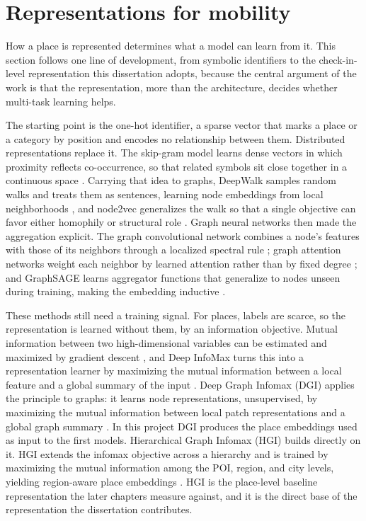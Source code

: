 
\section{Representations for mobility}
\label{sec:fund:repr}

How a place is represented determines what a model can learn from it. This section
follows one line of development, from symbolic identifiers to the check-in-level
representation this dissertation adopts, because the central argument of the work is
that the representation, more than the architecture, decides whether multi-task
learning helps.

The starting point is the one-hot identifier, a sparse vector that marks a place or a
category by position and encodes no relationship between them. Distributed
representations replace it. The skip-gram model learns dense vectors in which
proximity reflects co-occurrence, so that related symbols sit close together in a
continuous space \cite{mikolov2013word2vec}. Carrying that idea to graphs, DeepWalk
samples random walks and treats them as sentences, learning node embeddings from
local neighborhoods \cite{perozzi2014deepwalk}, and node2vec generalizes the walk so
that a single objective can favor either homophily or structural role
\cite{grover2016node2vec}. Graph neural networks then made the aggregation explicit.
The graph convolutional network combines a node's features with those of its
neighbors through a localized spectral rule \cite{kipf2017gcn}; graph attention
networks weight each neighbor by learned attention rather than by fixed degree
\cite{velivckovic2017graph}; and GraphSAGE learns aggregator functions that
generalize to nodes unseen during training, making the embedding inductive
\cite{hamilton2017graphsage}.

These methods still need a training signal. For places, labels are scarce, so the
representation is learned without them, by an information objective. Mutual
information between two high-dimensional variables can be estimated and maximized by
gradient descent \cite{belghazi2018mine}, and Deep InfoMax turns this into a
representation learner by maximizing the mutual information between a local feature
and a global summary of the input \cite{hjelm2019dim}. Deep Graph Infomax (DGI)
applies the principle to graphs: it learns node representations, unsupervised, by
maximizing the mutual information between local patch representations and a global
graph summary \cite{velickovic2019deep}. In this project DGI produces the place
embeddings used as input to the first models. Hierarchical Graph Infomax (HGI) builds
directly on it. HGI extends the infomax objective across a hierarchy and is trained by
maximizing the mutual information among the POI, region, and city levels, yielding
region-aware place embeddings \cite{huang2023hgi}. HGI is the place-level baseline
representation the later chapters measure against, and it is the direct base of the
representation the dissertation contributes.

